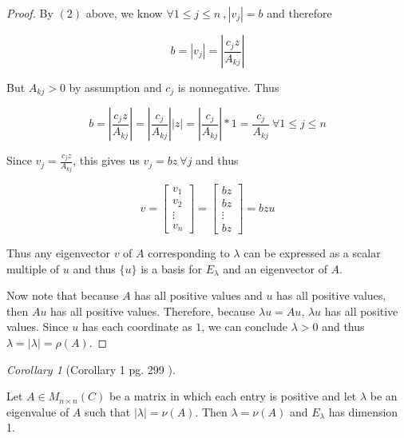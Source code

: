 \documentclass{amsart}
\theoremstyle{definition}
\theoremstyle{remark}
\newtheorem{corollary}{Corollary}[theorem]
\numberwithin{equation}{section}
\begin{document}
\begin{proof}
By $(2)$ above, we know $\forall  1 \leq j \leq n\ , |v_j| = b$ and therefore

$$b = |v_j| = |\frac{c_jz}{A_{kj}}|$$

But $A_{kj} > 0$ by assumption and $c_j$ is nonnegative.  
Thus

$$ b = |\frac{c_jz}{A_{kj}}| = |\frac{c_j}{A_{kj}}||z| = |\frac{c_j}{A_{kj}}|*1 = \frac{c_j}{A_{kj}} \ \forall 1 \leq j \leq n$$

Since $v_j = \frac{c_jz}{A_{kj}}$, this gives us $v_j = bz\ \forall j$ and thus 


\begin{equation}
    v = \begin{bmatrix}
           v_{1} \\
           v_{2} \\
           \vdots \\
           v_{n}
         \end{bmatrix}
     	= \begin{bmatrix}
           bz \\
           bz \\
           \vdots \\
           bz
         \end{bmatrix}
        = bzu 
\end{equation}

Thus any eigenvector $v$ of $A$ corresponding to $\lambda$ can be expressed as a scalar multiple of $u$ and thus $\{ u \}$ is a basis for $E_{\lambda}$ and an eigenvector of $A$.


Now note that because $A$ has all positive values and $u$ has all positive values, then $Au$ has all positive values. Therefore, because  $\lambda u = Au$, $\lambda u$ has all positive values.
Since $u$ has each coordinate as $1$, we can conclude $\lambda > 0$ and thus $\lambda = |\lambda| = \rho(A)$.


\end{proof}

\begin{corollary}[Corollary 1 pg. 299 \cite{friedberg2003linear} ]\label{cor5181}

	Let $A \in M_{n \times n}(C)$ be a matrix in which each entry is positive and let $\lambda$ be an eigenvalue of $A$ such that $|\lambda| = \nu(A)$.
	Then  $\lambda = \nu(A)$ and $E_{\lambda}$ has dimension 1. \newline

\end{corollary}
\end{document}
